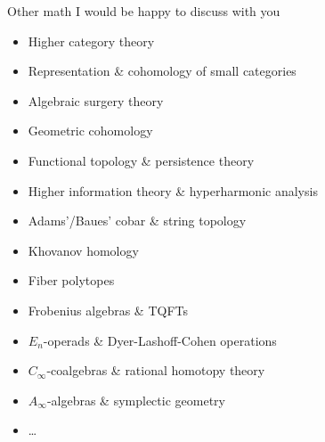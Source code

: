 \begin{frame}{Other math I would be happy to discuss with you}
	\begin{itemize}
		\item \pause Higher category theory
		\item \pause Representation \& cohomology of small categories
		\item \pause Algebraic surgery theory
		\item \pause Geometric cohomology
		\item \pause Functional topology \& persistence theory
		\item \pause Higher information theory \& hyperharmonic analysis
		\item \pause Adams'/Baues' cobar \& string topology
		\item \pause Khovanov homology
		\item \pause Fiber polytopes
		\item \pause Frobenius algebras \& TQFTs
		\item \pause $E_n$-operads \& Dyer-Lashoff-Cohen operations
		\item \pause $C_\infty$-coalgebras \& rational homotopy theory
		\item \pause $A_\infty$-algebras \& symplectic geometry
		\item \dots
	\end{itemize}
\end{frame}
